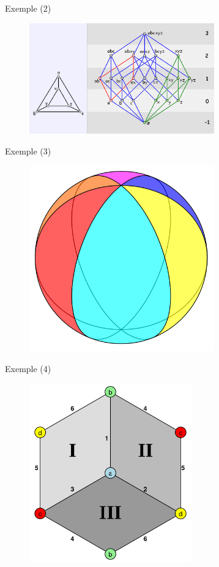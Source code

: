 \documentclass[10pt]{beamer}
\begin{document}
\begin{frame}{Exemple (2)}
  \begin{figure}[H]
    \begin{center}
      \includegraphics[width=8cm]{Prism.png}
    \end{center}
  \end{figure}
\end{frame}

\begin{frame}{Exemple (3)}
  \begin{figure}[H]
    \begin{center}
      \includegraphics[width=8cm]{Hosohedron.png}
    \end{center}
  \end{figure}
\end{frame}

\begin{frame}{Exemple (4)}
  \begin{figure}[H]
    \begin{center}
      \includegraphics[width=7cm]{Hemicube.png}
    \end{center}
  \end{figure}
\end{frame}
\end{document}
